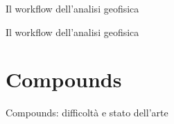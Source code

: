 \documentclass[xcolor=svgnames]{beamer}
\begin{document}
        \begin{frame}{Il workflow dell'analisi geofisica}
            \resizebox{1\textwidth}{!}{%
                \begin{tikzpicture}
                    
                \end{tikzpicture}
            }
        \end{frame}

        \begin{frame}{Il workflow dell'analisi geofisica}
            \resizebox{1\textwidth}{!}{%
                \begin{tikzpicture}
                    
                \end{tikzpicture}
            }
        \end{frame}

    \section{Compounds}
        \begin{frame}{Compounds: difficoltà e stato dell'arte}
            \begin{columns}[c]
                \centering
            \end{columns}
        \end{frame}
\end{document}
